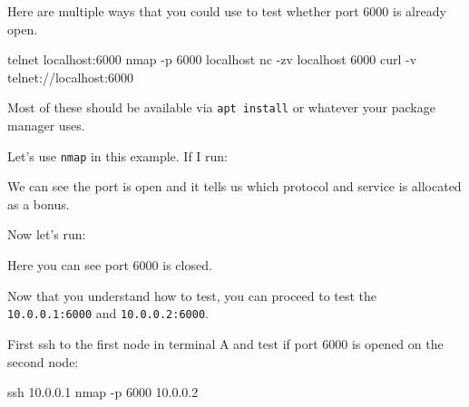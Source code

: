\documentclass[
]{report}
\newenvironment{Shaded}{\begin{snugshade}}{\end{snugshade}}
\newcommand{\AttributeTok}[1]{\textcolor[rgb]{0.40,0.45,0.13}{#1}}
\newcommand{\ExtensionTok}[1]{\textcolor[rgb]{0.00,0.23,0.31}{#1}}
\newcommand{\FunctionTok}[1]{\textcolor[rgb]{0.28,0.35,0.67}{#1}}
\newcommand{\NormalTok}[1]{\textcolor[rgb]{0.00,0.23,0.31}{#1}}
\begin{document}
Here are multiple ways that you could use to test whether port 6000 is
already open.

\begin{Shaded}
\begin{Highlighting}[]
\ExtensionTok{telnet}\NormalTok{ localhost:6000}
\FunctionTok{nmap} \AttributeTok{{-}p}\NormalTok{ 6000 localhost}
\ExtensionTok{nc} \AttributeTok{{-}zv}\NormalTok{ localhost 6000}
\ExtensionTok{curl} \AttributeTok{{-}v}\NormalTok{ telnet://localhost:6000}
\end{Highlighting}
\end{Shaded}

Most of these should be available via \texttt{apt\ install} or whatever
your package manager uses.

Let's use \texttt{nmap} in this example. If I run:

\begin{Shaded}
\end{Shaded}

We can see the port is open and it tells us which protocol and service
is allocated as a bonus.

Now let's run:

\begin{Shaded}
\end{Shaded}

Here you can see port 6000 is closed.

Now that you understand how to test, you can proceed to test the
\texttt{10.0.0.1:6000} and \texttt{10.0.0.2:6000}.

First ssh to the first node in terminal A and test if port 6000 is
opened on the second node:

\begin{Shaded}
\begin{Highlighting}[]
\FunctionTok{ssh}\NormalTok{ 10.0.0.1}
\FunctionTok{nmap} \AttributeTok{{-}p}\NormalTok{ 6000 10.0.0.2}
\end{Highlighting}
\end{Shaded}
\end{document}
